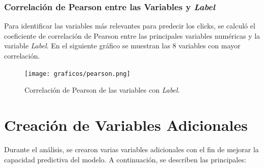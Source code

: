 \documentclass[a4paper,11pt]{article}
\begin{document}
\subsubsection{Correlación de Pearson entre las Variables y \textit{Label}}

Para identificar las variables más relevantes para predecir los clicks, se calculó el coeficiente de correlación de Pearson entre las principales variables numéricas y la variable \textit{Label}. En el siguiente gráfico se muestran las 8 variables con mayor correlación.

\begin{figure}[H]
    \centering
    \texttt{[image: graficos/pearson.png]}
    \caption{Correlación de Pearson de las variables con \textit{Label}.}
\end{figure}

\section{Creación de Variables Adicionales}

Durante el análisis, se crearon varias variables adicionales con el fin de mejorar la capacidad predictiva del modelo. A continuación, se describen las principales:
\end{document}
